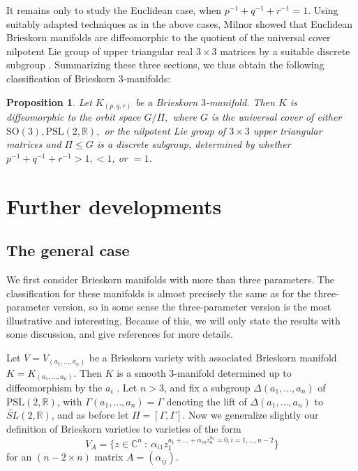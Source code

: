 \documentclass{article}
\newtheorem{proposition}{Proposition}[section]
\begin{document}
It remains only to study the Euclidean case, when $p^{-1} + q^{-1} + r^{-1} = 1$. Using suitably adapted techniques as in the above cases, Milnor showed that Euclidean Brieskorn manifolds are diffeomorphic to the quotient of the universal cover nilpotent Lie group of upper triangular real $3 \times 3$ matrices by a suitable discrete subgroup \cite{milnor_1975}. Summarizing these three sections, we thus obtain the following classification of Brieskorn $3$-manifolds:
\begin{proposition}
Let $K_{(p,q,r)}$ be a Brieskorn $3$-manifold. Then $K$ is diffeomorphic to the orbit space $G/\Pi,$ where $G$ is the universal cover of either $\mathrm{SO}(3), \mathrm{PSL}(2, \mathbb{R}),$ or the nilpotent Lie group of $3 \times 3$ upper triangular matrices and $\Pi \leq G$ is a discrete subgroup, determined by whether $p^{-1} + q^{-1} + r^{-1} > 1, <1$, or $=1$.
\end{proposition}

\section{Further developments}

\subsection{The general case}

We first consider Brieskorn manifolds with more than three parameters. The classification for these manifolds is almost precisely the same as for the three-parameter version, so in some sense the three-parameter version is the most illustrative and interesting. Because of this, we will only state the results with some discussion, and give references for more details. 

Let $V = V_{(a_1, \dots, a_n)}$ be a Brieskorn variety with associated Brieskorn manifold $K = K_{(a_1, \dots, a_n)}$. Then $K$ is a smooth $3$-manifold determined up to diffeomorphism by the $a_i$ \cite{hamm_1972}. Let $n >3$, and fix a subgroup $\Delta(a_1, \dots, a_n)$ of $\mathrm{PSL}(2, \mathbb{R})$, with $\Gamma(a_1, \dots, a_n) = \Gamma$ denoting the lift of $\Delta(a_1, \dots, a_n)$ to $\widetilde{SL}(2,\mathbb{R})$, and as before let $\Pi = [\Gamma, \Gamma]$. Now we generalize slightly our definition of Brieskorn varieties to varieties of the form
\[V_A = \{z \in \mathbb{C}^n\ :\ \alpha_{i1} z_1^{a_1 + \dots + \alpha_{in}z_n^{a_n} = 0, i = 1, \dots, n-2}\}\]
for an $(n-2 \times n)$ matrix $A = (\alpha_{ij}).$
\end{document}
